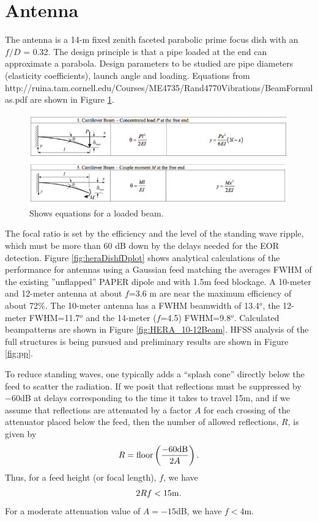 \documentclass[11pt]{article}
\begin{document}
\section{Antenna}
The antenna is a 14-m fixed zenith faceted parabolic prime focus dish with an $f/D$ = 0.32.  The design principle is that a pipe loaded at the end can approximate a parabola.  Design parameters to be studied are pipe diameters (elasticity coefficients), launch angle and loading. Equations from
http://ruina.tam.cornell.edu/Courses/ME4735/Rand4770Vibrations/BeamFormulas.pdf
are shown in Figure \ref{fig:beam}.

\begin{figure}[H]
\centering
\includegraphics[width=\textwidth]{plots/beam.png}
\caption{Shows equations for a loaded beam.}
\label{fig:beam}
\end{figure}

The focal ratio is set by the efficiency and the level of the standing wave ripple, which must be more than 60 dB down by the delays needed for the EOR detection.  Figure \ref{fig:heraDishfDplot} shows analytical calculations of the performance for antennas using a Gaussian feed matching the averages FWHM of the existing ''unflapped'' PAPER dipole and with 1.5m feed blockage.  A 10-meter and 12-meter antenna at about $f$=3.6 m are near the maximum efficiency of about 72\%.  The 10-meter antenna has a FWHM beamwidth of 13.4$^o$, the 12-meter FWHM=11.7$^o$ and the 14-meter ($f$=4.5) FWHM=9.8$^o$.  Calculated beampatterns are shown in Figure \ref{fig:HERA_10-12Beam}.  HFSS analysis of the full structures is being pursued and preliminary results are shown in Figure \ref{fig:pp}.

To reduce standing waves, one typically adds a ``splash cone'' directly below the feed to scatter the radiation.
If we posit that reflections must be suppressed by $-60$dB at delays corresponding to the time it takes
to travel 15m, and if we assume that reflections are attenuated by a factor $A$ for each crossing of the
attenuator placed below the feed, then the number of allowed reflections, $R$, is given by
\begin{equation}
R={\rm floor}\left(\frac{-60{\rm dB}}{2A}\right).
\end{equation}
Thus, for a feed height (or focal length), $f$, we have
\begin{equation}
2Rf<15{\rm m}.
\end{equation}
For a moderate attenuation value of $A=-15$dB, we have $f<4$m.
\end{document}

